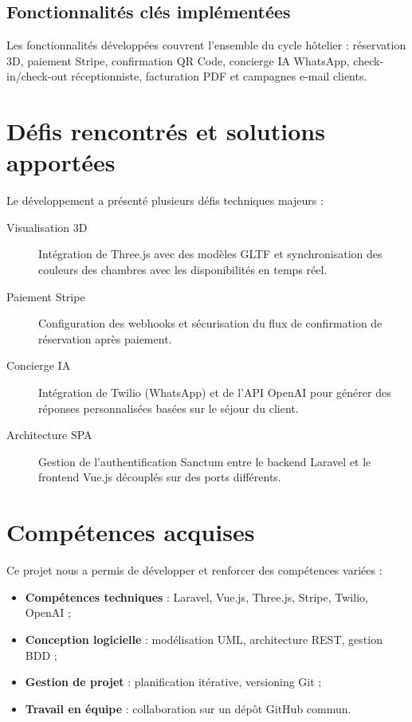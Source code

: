 \documentclass[12pt, a4paper]{report}
\begin{document}
\subsection*{Fonctionnalités clés implémentées}

Les fonctionnalités développées couvrent l'ensemble du cycle hôtelier :
réservation 3D, paiement Stripe, confirmation QR Code, concierge IA WhatsApp,
check-in/check-out réceptionniste, facturation PDF et campagnes e-mail clients.

\section*{Défis rencontrés et solutions apportées}

Le développement a présenté plusieurs défis techniques majeurs :
\begin{description}
  \item[Visualisation 3D] Intégration de Three.js avec des modèles GLTF et
    synchronisation des couleurs des chambres avec les disponibilités en temps réel.
  \item[Paiement Stripe] Configuration des webhooks et sécurisation du flux
    de confirmation de réservation après paiement.
  \item[Concierge IA] Intégration de Twilio (WhatsApp) et de l'API OpenAI pour
    générer des réponses personnalisées basées sur le séjour du client.
  \item[Architecture SPA] Gestion de l'authentification Sanctum entre le backend
    Laravel et le frontend Vue.js découplés sur des ports différents.
\end{description}

\section*{Compétences acquises}

Ce projet nous a permis de développer et renforcer des compétences variées :
\begin{itemize}
  \item \textbf{Compétences techniques} : Laravel, Vue.js, Three.js, Stripe, Twilio, OpenAI ;
  \item \textbf{Conception logicielle} : modélisation UML, architecture REST, gestion BDD ;
  \item \textbf{Gestion de projet} : planification itérative, versioning Git ;
  \item \textbf{Travail en équipe} : collaboration sur un dépôt GitHub commun.
\end{itemize}
\end{document}
